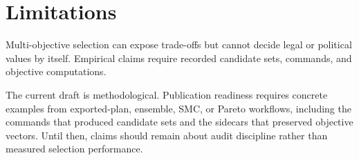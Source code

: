 \section{Limitations}

Multi-objective selection can expose trade-offs but cannot decide legal or
political values by itself. Empirical claims require recorded candidate sets,
commands, and objective computations.

The current draft is methodological. Publication readiness requires concrete
examples from exported-plan, ensemble, SMC, or Pareto workflows, including the
commands that produced candidate sets and the sidecars that preserved objective
vectors. Until then, claims should remain about audit discipline rather than
measured selection performance.
